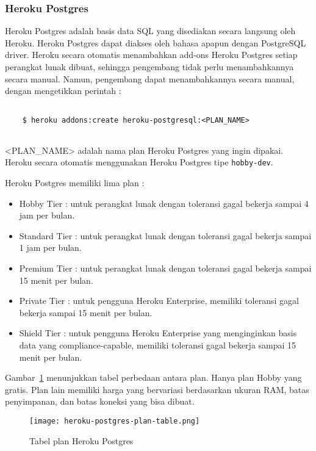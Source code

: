 \subsubsection{Heroku Postgres}
Heroku Postgres adalah basis data SQL yang disediakan secara langsung oleh Heroku. Heroku Postgres dapat diakses oleh bahasa apapun dengan PostgreSQL driver. Heroku secara otomatis menambahkan add-ons Heroku Postgres setiap perangkat lunak dibuat, sehingga pengembang tidak perlu menambahkannya secara manual. Namun, pengembang dapat menambahkannya secara manual, dengan mengetikkan perintah :
\begin{lstlisting}
	
	$ heroku addons:create heroku-postgresql:<PLAN_NAME>
	
\end{lstlisting}
<PLAN\_NAME> adalah nama plan Heroku Postgres yang ingin dipakai. Heroku secara otomatis menggunakan Heroku Postgres tipe \texttt{hobby-dev}.

Heroku Postgres memiliki lima plan :
\begin{itemize}
\item Hobby Tier : untuk perangkat lunak dengan toleransi gagal bekerja sampai 4 jam per bulan.
\item Standard Tier : untuk perangkat lunak dengan toleransi gagal bekerja sampai 1 jam per bulan.
\item Premium Tier : untuk perangkat lunak dengan toleransi gagal bekerja sampai 15 menit per bulan.
\item Private Tier : untuk pengguna Heroku Enterprise, memiliki toleransi gagal bekerja sampai 15 menit per bulan.
\item Shield Tier : untuk pengguna Heroku Enterprise yang menginginkan basis data yang compliance-capable, memiliki toleransi gagal bekerja sampai 15 menit per bulan.
\end{itemize}

Gambar~\ref{fig:heroku-postgres-plan-table} menunjukkan tabel perbedaan antara plan. Hanya plan Hobby yang gratis. Plan lain memiliki harga yang bervariasi berdasarkan ukuran RAM, batas penyimpanan, dan batas koneksi yang bisa dibuat.
\begin{figure}[H]
	\centering  
	\texttt{[image: heroku-postgres-plan-table.png]}  
	\caption[Tabel plan Heroku Postgres]{Tabel plan Heroku Postgres} 
	\label{fig:heroku-postgres-plan-table} 
\end{figure}

